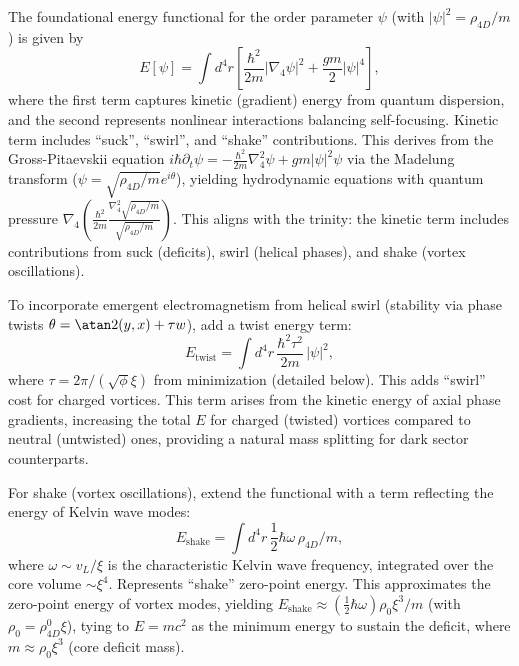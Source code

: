 The foundational energy functional for the order parameter $\psi$ (with $|\psi|^2 = \rho_{4D}/m$) is given by
\begin{equation}
E[\psi] = \int d^4 r \left[ \frac{\hbar^2}{2m} |\nabla_4 \psi|^2 + \frac{g m}{2} |\psi|^4 \right],
\end{equation}
where the first term captures kinetic (gradient) energy from quantum dispersion, and the second represents nonlinear interactions balancing self-focusing. Kinetic term includes ``suck'', ``swirl'', and ``shake'' contributions. This derives from the Gross-Pitaevskii equation $i \hbar \partial_t \psi = -\frac{\hbar^2}{2 m} \nabla_4^2 \psi + g m |\psi|^2 \psi$ via the Madelung transform ($\psi = \sqrt{\rho_{4D}/m} e^{i \theta}$), yielding hydrodynamic equations with quantum pressure $\nabla_4 \left( \frac{\hbar^2}{2 m} \frac{\nabla_4^2 \sqrt{\rho_{4D}/m}}{\sqrt{\rho_{4D}/m}} \right)$. This aligns with the trinity: the kinetic term includes contributions from suck (deficits), swirl (helical phases), and shake (vortex oscillations).

To incorporate emergent electromagnetism from helical swirl (stability via phase twists $\theta = \atan2(y, x) + \tau w$), add a twist energy term:
\begin{equation}
E_{\text{twist}} = \int d^4 r \, \frac{\hbar^2 \tau^2}{2m} \, |\psi|^2,
\end{equation}
where $\tau = 2\pi / (\sqrt{\phi} \xi)$ from minimization (detailed below). This adds ``swirl'' cost for charged vortices. This term arises from the kinetic energy of axial phase gradients, increasing the total $E$ for charged (twisted) vortices compared to neutral (untwisted) ones, providing a natural mass splitting for dark sector counterparts.

For shake (vortex oscillations), extend the functional with a term reflecting the energy of Kelvin wave modes:
\begin{equation}
E_{\text{shake}} = \int d^4 r \, \frac{1}{2} \hbar \omega \, \rho_{4D} / m,
\end{equation}
where $\omega \sim v_L / \xi$ is the characteristic Kelvin wave frequency, integrated over the core volume $\sim \xi^4$. Represents ``shake'' zero-point energy. This approximates the zero-point energy of vortex modes, yielding $E_{\text{shake}} \approx (\frac{1}{2} \hbar \omega) \rho_0 \xi^3 / m$ (with $\rho_0 = \rho_{4D}^0 \xi$), tying to $E = m c^2$ as the minimum energy to sustain the deficit, where $m \approx \rho_0 \xi^3$ (core deficit mass).

